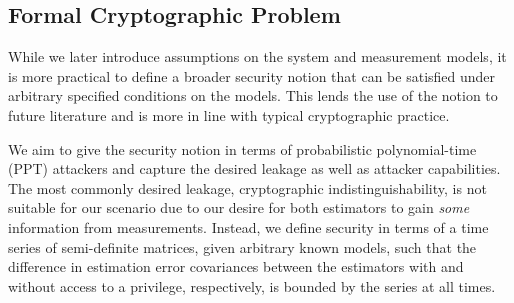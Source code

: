 \subsection{Formal Cryptographic Problem}\label{subsec:priv_estimation:crypto_problem}
While we later introduce assumptions on the system and measurement models, it is more practical to define a broader security notion that can be satisfied under arbitrary specified conditions on the models. This lends the use of the notion to future literature and is more in line with typical cryptographic practice.

We aim to give the security notion in terms of probabilistic polynomial-time (PPT) attackers and capture the desired leakage as well as attacker capabilities. The most commonly desired leakage, cryptographic indistinguishability, is not suitable for our scenario due to our desire for both estimators to gain \textit{some} information from measurements. Instead, we define security in terms of a time series of semi-definite matrices, given arbitrary known models, such that the difference in estimation error covariances between the estimators with and without access to a privilege, respectively, is bounded by the series at all times.

